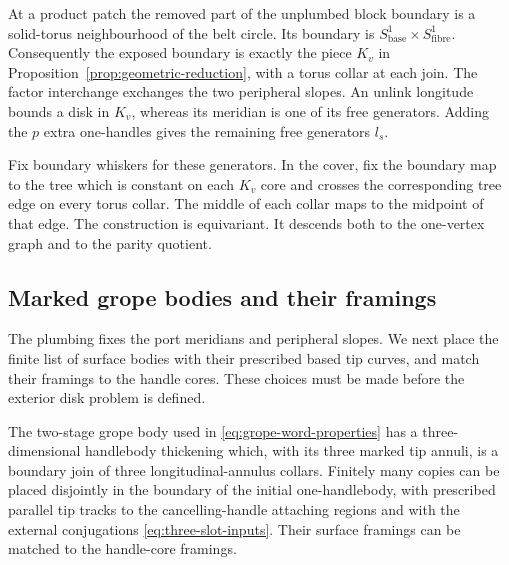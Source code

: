 At a product patch the removed part of the unplumbed block boundary is a
solid-torus neighbourhood of the belt circle. Its boundary is
\(S^1_{\mathrm{base}}\times S^1_{\mathrm{fibre}}\).
Consequently the exposed boundary is exactly the piece \(K_v\) in
Proposition~\ref{prop:geometric-reduction}, with a torus collar at each join.
The factor interchange exchanges the two peripheral slopes.
An unlink longitude bounds a disk in \(K_v\), whereas its meridian is
one of its free generators. Adding the \(p\) extra one-handles gives the
remaining free generators \(l_s\).

Fix boundary whiskers for these generators. In the cover, fix the boundary
map to the tree which is constant on each \(K_v\) core and crosses the
corresponding tree edge on every torus collar. The middle of each collar
maps to the midpoint of that edge. The construction is equivariant.
It descends both to the one-vertex graph and to the parity quotient.

\subsection{Marked grope bodies and their framings}

The plumbing fixes the port meridians and peripheral slopes. We next
place the finite list of surface bodies with their prescribed based tip
curves, and match their framings to the handle cores. These choices must
be made before the exterior disk problem is defined.

\begin{lemma}
\label{lem:marked-body}
The two-stage grope body used in \eqref{eq:grope-word-properties} has a
three-dimensional handlebody thickening which, with its three marked
tip annuli, is a boundary join of three longitudinal-annulus collars.
Finitely many copies can be placed disjointly in the boundary of the
initial one-handlebody, with prescribed parallel tip tracks to the
cancelling-handle attaching regions and with the external conjugations
\eqref{eq:three-slot-inputs}. Their surface framings can be matched to the
handle-core framings.
\end{lemma}

